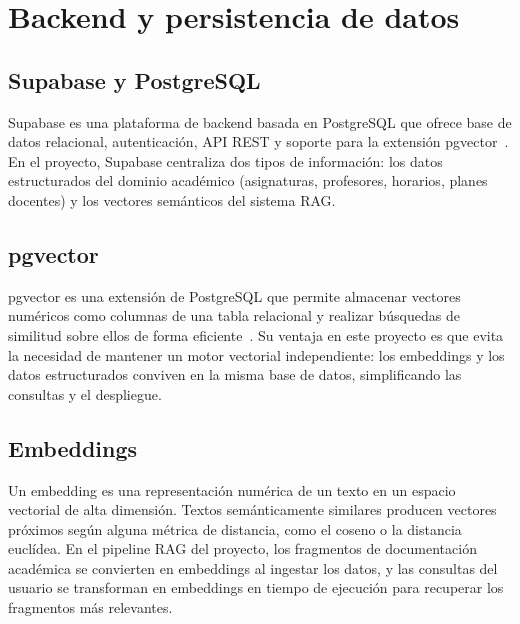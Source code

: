 \section{Backend y persistencia de datos}
\label{sec:backend}

\subsection{Supabase y PostgreSQL}

Supabase es una plataforma de backend basada en PostgreSQL que ofrece base de datos relacional, autenticación, API REST y soporte para la extensión pgvector~\cite{supabasedocs}. En el proyecto, Supabase centraliza dos tipos de información: los datos estructurados del dominio académico (asignaturas, profesores, horarios, planes docentes) y los vectores semánticos del sistema RAG.

\subsection{pgvector}

pgvector es una extensión de PostgreSQL que permite almacenar vectores numéricos como columnas de una tabla relacional y realizar búsquedas de similitud sobre ellos de forma eficiente~\cite{pgvectorgithub}. Su ventaja en este proyecto es que evita la necesidad de mantener un motor vectorial independiente: los embeddings y los datos estructurados conviven en la misma base de datos, simplificando las consultas y el despliegue.

\subsection{Embeddings}

Un embedding es una representación numérica de un texto en un espacio vectorial de alta dimensión. Textos semánticamente similares producen vectores próximos según alguna métrica de distancia, como el coseno o la distancia euclídea. En el pipeline RAG del proyecto, los fragmentos de documentación académica se convierten en embeddings al ingestar los datos, y las consultas del usuario se transforman en embeddings en tiempo de ejecución para recuperar los fragmentos más relevantes.
